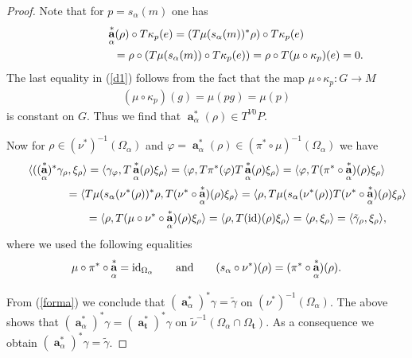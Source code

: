 \documentclass[pdftex]{sigma}
\newcommand{\Tt}{\textbf{t}}
\renewcommand{\to}{\rightarrow}
\DeclareMathOperator{\anch}{\mathbf{a}}
\newcommand{\tbp}{\nu} %
\newcommand{\id}{\text{\upshape id}}
\numberwithin{equation}{section}
\begin{document}
\begin{proof}
Note that for $p=s_\alpha(m)$ one has
\begin{gather}
 \anch^*_\alpha(\rho)\circ T\kappa_p(e) =(T\mu(s_\alpha(m))^*\rho)\circ T\kappa_p(e)\nonumber\\
\hphantom{\anch^*_\alpha(\rho)\circ T\kappa_p(e)}{} =\rho\circ (T\mu(s_\alpha(m))\circ T\kappa_p(e))=\rho\circ T(\mu\circ\kappa_p)(e)=0.\label{d1}
\end{gather}
The last equality in (\ref{d1}) follows from the fact that the map $\mu\circ\kappa_p\colon G\to M$
\begin{gather*}(\mu\circ\kappa_p)(g)=\mu(pg)=\mu(p)\end{gather*}
is constant on $G$. Thus we f\/ind that $\anch^*_\alpha(\rho)\in T^{V0}P$.

Now for $\rho\in (\tbp^*)^{-1}(\Omega_\alpha)$ and $\varphi=\anch^*_\alpha(\rho)\in (\pi^*\circ \mu)^{-1}(\Omega_\alpha)$ we have
\begin{gather}
\langle((\anch^*_\alpha)^*\gamma_\rho,\xi_\rho \rangle =\langle \gamma_\varphi,T\anch^*_\alpha(\rho)\xi_\rho\rangle
= \langle \varphi, T\pi^*(\varphi)T\anch^*_\alpha(\rho)\xi_\rho\rangle = \langle \varphi, T(\pi^*\circ \anch^*_\alpha)(\rho)\xi_\rho\rangle\nonumber\\
\hphantom{\langle((\anch^*_\alpha)^*\gamma_\rho,\xi_\rho \rangle}{} = \langle T\mu(s_\alpha(\tbp^*(\rho))^*\rho, T(\tbp^*\circ \anch^*_\alpha)(\rho)\xi_\rho\rangle
 = \langle\rho, T\mu(s_\alpha(\tbp^*(\rho))T(\tbp^*\circ \anch^*_\alpha)(\rho)\xi_\rho \rangle\nonumber\\
\hphantom{\langle((\anch^*_\alpha)^*\gamma_\rho,\xi_\rho \rangle}{} = \langle \rho, T(\mu\circ\tbp^*\circ \anch^*_\alpha)(\rho)\xi_\rho \rangle = \langle \rho, T(\id)(\rho)\xi_\rho\rangle
= \langle\rho, \xi_\rho \rangle = \langle\tilde\gamma_\rho, \xi_\rho \rangle,\label{forma}
\end{gather}
where we used the following equalities
\begin{gather*}\mu\circ \pi^*\circ \anch^*_\alpha
=\id_{\Omega_\alpha} \qquad {\rm and} \qquad (s_\alpha\circ\tbp^*)(\rho)=(\pi^*\circ\anch^*_\alpha)(\rho).
\end{gather*}

From (\ref{forma}) we conclude that ${(\anch^*_\alpha)}^* \gamma=\tilde\gamma $ on $ (\tbp^*)^{-1}(\Omega_\alpha)$. The above shows that ${(\anch^*_\alpha)}^* \gamma={(\anch^*_\Tt)}^*\gamma$ on $\tilde \tbp^{-1}(\Omega_\alpha\cap\Omega_\Tt)$. As a consequence we obtain ${(\anch^*_\alpha)}^* \gamma=\tilde\gamma$.
\end{proof}
\end{document}
